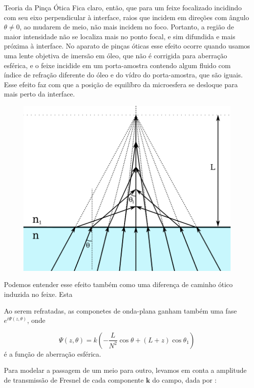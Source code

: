 \begin{chapter}{Teoria da Pinça Ótica}
Fica claro, então, que para um feixe focalizado incidindo com seu eixo perpendicular à interface, raios que incidem em direções com ângulo $\theta\ne 0$, ao mudarem de meio, não mais incidem no foco. Portanto, a região de maior intensidade não se localiza mais no ponto focal, e sim difundida e mais próxima à interface. No aparato de pinças óticas esse efeito ocorre quando usamos uma lente objetiva de imersão em óleo, que não é corrigida para aberração esférica, e o feixe incidide em um porta-amostra contendo algum fluido com índice de refração diferente do óleo e do vídro do porta-amostra, que são iguais. Esse efeito faz com que a posição de equilíbro da microesfera se desloque para mais perto da interface.
%
\begin{figure}
\begin{center}
\includegraphics[scale=1.]{aberracao_esf}
\caption{}
\label{ab_esf}
\end{center}
\end{figure}
%

Podemos entender esse efeito também como uma diferença de caminho ótico induzida no feixe. Esta 

Ao serem refratadas, as componetes de onda-plana ganham também uma fase $e^{i\Psi(z, \theta)}$, onde

\begin{equation}
\Psi(z,\theta)=k\left( -\frac{L}{N^2}\cos\theta +(L+z)\cos\theta_1 \right) 
\label{faseSA}
\end{equation}
%
é a função de aberração esférica.

Para modelar a passagem de um meio para outro, levamos em conta a amplitude de transmissão de Fresnel de cada componente ${\mathbf k}$ do campo, dada por \cite{Viana2007}:


\end{chapter}
